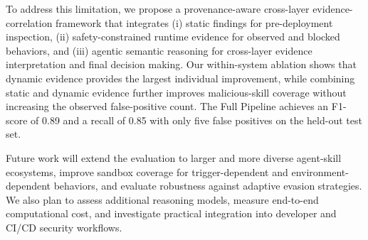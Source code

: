 To address this limitation, we propose a provenance-aware cross-layer evidence-correlation framework that integrates (i) static findings for pre-deployment inspection, (ii) safety-constrained runtime evidence for observed and blocked behaviors, and (iii) agentic semantic reasoning for cross-layer evidence interpretation and final decision making. Our within-system ablation shows that dynamic evidence provides the largest individual improvement, while combining static and dynamic evidence further improves malicious-skill coverage without increasing the observed false-positive count. The Full Pipeline achieves an F1-score of 0.89 and a recall of 0.85 with only five false positives on the held-out test set. 

Future work will extend the evaluation to larger and more diverse agent-skill ecosystems, improve sandbox coverage for trigger-dependent and environment-dependent behaviors, and evaluate robustness against adaptive evasion strategies. We also plan to assess additional reasoning models, measure end-to-end computational cost, and investigate practical integration into developer and CI/CD security workflows.




